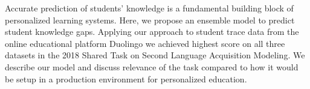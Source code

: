 Accurate prediction of students' knowledge is a fundamental building block of personalized learning systems. Here, we propose an ensemble model to predict student knowledge gaps. Applying our approach to student trace data from the online educational platform Duolingo we achieved highest score on all three datasets in the 2018 Shared Task on Second Language Acquisition Modeling. We describe our model and discuss relevance of the task compared to how it would be setup in a production environment for personalized education.
